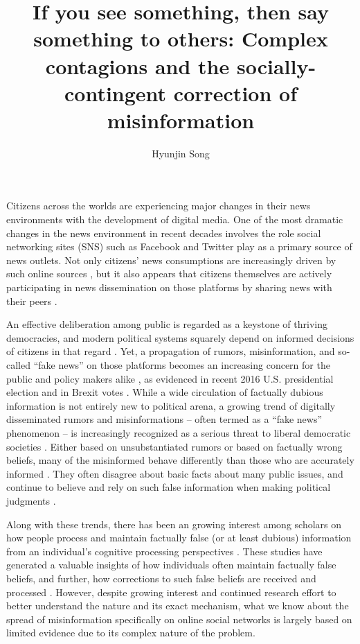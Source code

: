 \documentclass[man, 12pt, a4paper, nolmodern, noextraspace]{apa6}
\title{If you see something, then say something to others: Complex contagions and the socially-contingent correction of misinformation}
\author{\addvspace{.25in} Hyunjin Song}
\affiliation{Department of Communication, University of Vienna, Austria}
\begin{document}
\setcounter{page}{0}
\maketitle
  Citizens across the worlds are experiencing major changes in their news environments with the development of digital media. One of the most dramatic changes in the news environment in recent decades involves the role social networking sites (SNS) such as Facebook and Twitter play as a primary source of news outlets. Not only citizens' news consumptions are increasingly driven by such online sources \parencite{shearer2017news}, but it also appears that citizens themselves are actively participating in news dissemination on those platforms by sharing news with their peers \parencite[e.g.,][]{shearer2017news, lee2017people}. 

  An effective deliberation among public is regarded as a keystone of thriving democracies, and modern political systems squarely depend  on  informed  decisions of citizens in that regard \parencite{carpini1996}. Yet, a propagation of rumors, misinformation, and so-called \enquote{fake news} on those platforms becomes an increasing concern for the public and policy makers alike \parencite{allcott2017social, lazer2017combating}, as evidenced in recent 2016 U.S. presidential election \parencite{guess2018selective, giglietto2016fakes, allcott2017social} and in Brexit votes \parencite{nyt_2017}. While a wide circulation of factually dubious information is not entirely new to political arena, a growing trend of digitally disseminated rumors and misinformations -- often termed as a \enquote{fake news} phenomenon -- is increasingly recognized as a serious threat to liberal democratic societies \parencite{allcott2017social, lazer2017combating}. Either based on unsubstantiated rumors or based on factually wrong beliefs, many of the misinformed behave differently than those who are accurately informed \parencite{kuklinski2000misinformation}. They often disagree about basic facts about many public issues, and continue to believe and rely on such false information when making political judgments \parencite{nyhan2010corrections,thorson_2016}. 

  Along with these trends, there has been an growing interest among scholars on how people process and maintain factually false (or at least dubious) information from an individual's cognitive processing perspectives \parencite{Lewandowsky_2012PSPI, kuklinski2000misinformation, weeks2015emotions}. These studies have generated a valuable insights of how individuals often maintain factually false beliefs, and further, how corrections to such false beliefs are received and processed \parencite{Lewandowsky_2012PSPI, thorson_2016, garrett2016driving}. However, despite growing interest and continued research effort to better understand the nature and its exact mechanism, what we know about the spread of misinformation specifically on online social networks is largely based on limited evidence due to its complex nature of the problem.
\end{document}
